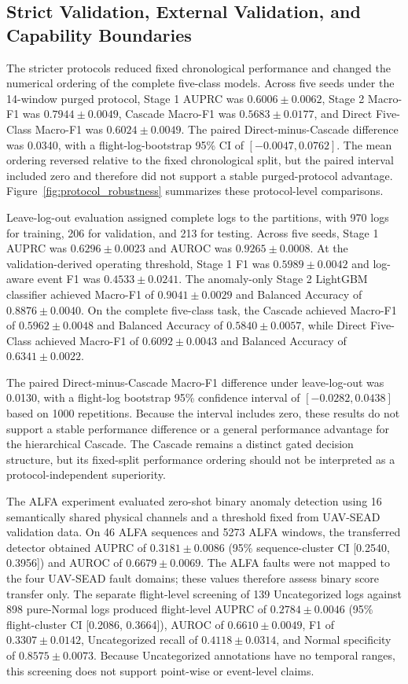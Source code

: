 \subsection{Strict Validation, External Validation, and Capability Boundaries}

The stricter protocols reduced fixed chronological performance and changed the numerical ordering of the complete five-class models. Across five seeds under the 14-window purged protocol, Stage 1 AUPRC was $0.6006 \pm 0.0062$, Stage 2 Macro-F1 was $0.7944 \pm 0.0049$, Cascade Macro-F1 was $0.5683 \pm 0.0177$, and Direct Five-Class Macro-F1 was $0.6024 \pm 0.0049$. The paired Direct-minus-Cascade difference was 0.0340, with a flight-log-bootstrap 95\% CI of $[-0.0047, 0.0762]$. The mean ordering reversed relative to the fixed chronological split, but the paired interval included zero and therefore did not support a stable purged-protocol advantage. Figure~\ref{fig:protocol_robustness} summarizes these protocol-level comparisons.

Leave-log-out evaluation assigned complete logs to the partitions, with 970 logs for training, 206 for validation, and 213 for testing. Across five seeds, Stage 1 AUPRC was $0.6296 \pm 0.0023$ and AUROC was $0.9265 \pm 0.0008$. At the validation-derived operating threshold, Stage 1 F1 was $0.5989 \pm 0.0042$ and log-aware event F1 was $0.4533 \pm 0.0241$. The anomaly-only Stage 2 LightGBM classifier achieved Macro-F1 of $0.9041 \pm 0.0029$ and Balanced Accuracy of $0.8876 \pm 0.0040$. On the complete five-class task, the Cascade achieved Macro-F1 of $0.5962 \pm 0.0048$ and Balanced Accuracy of $0.5840 \pm 0.0057$, while Direct Five-Class achieved Macro-F1 of $0.6092 \pm 0.0043$ and Balanced Accuracy of $0.6341 \pm 0.0022$.

The paired Direct-minus-Cascade Macro-F1 difference under leave-log-out was 0.0130, with a flight-log bootstrap 95\% confidence interval of $[-0.0282, 0.0438]$ based on 1000 repetitions. Because the interval includes zero, these results do not support a stable performance difference or a general performance advantage for the hierarchical Cascade. The Cascade remains a distinct gated decision structure, but its fixed-split performance ordering should not be interpreted as a protocol-independent superiority.

The ALFA experiment evaluated zero-shot binary anomaly detection using 16 semantically shared physical channels and a threshold fixed from UAV-SEAD validation data. On 46 ALFA sequences and 5273 ALFA windows, the transferred detector obtained AUPRC of $0.3181 \pm 0.0086$ (95\% sequence-cluster CI [0.2540, 0.3956]) and AUROC of $0.6679 \pm 0.0069$. The ALFA faults were not mapped to the four UAV-SEAD fault domains; these values therefore assess binary score transfer only. The separate flight-level screening of 139 Uncategorized logs against 898 pure-Normal logs produced flight-level AUPRC of $0.2784 \pm 0.0046$ (95\% flight-cluster CI [0.2086, 0.3664]), AUROC of $0.6610 \pm 0.0049$, F1 of $0.3307 \pm 0.0142$, Uncategorized recall of $0.4118 \pm 0.0314$, and Normal specificity of $0.8575 \pm 0.0073$. Because Uncategorized annotations have no temporal ranges, this screening does not support point-wise or event-level claims.

